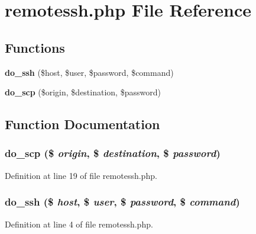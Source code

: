 \section{remotessh.php File Reference}
\label{remotessh_8php}
\subsection*{Functions}
\begin{CompactItemize}
\item 
{\bf do\_\-ssh} (\$host, \$user, \$password, \$command)
\item 
{\bf do\_\-scp} (\$origin, \$destination, \$password)
\end{CompactItemize}


\subsection{Function Documentation}
\subsubsection{\setlength{\rightskip}{0pt plus 5cm}do\_\-scp (\$ {\em origin}, \$ {\em destination}, \$ {\em password})}\label{remotessh_8php_a1}




Definition at line 19 of file remotessh.php.
\subsubsection{\setlength{\rightskip}{0pt plus 5cm}do\_\-ssh (\$ {\em host}, \$ {\em user}, \$ {\em password}, \$ {\em command})}\label{remotessh_8php_a0}




Definition at line 4 of file remotessh.php.